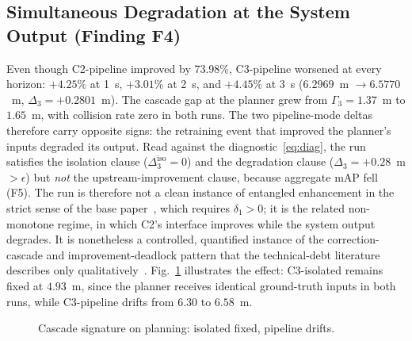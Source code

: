 \documentclass[conference]{IEEEtran}
\begin{document}
\subsection{Simultaneous Degradation at the System Output (Finding F4)}
Even though C2-pipeline improved by 73.98\%, C3-pipeline worsened at every
horizon: $+4.25\%$ at 1~s, $+3.01\%$ at 2~s, and $+4.45\%$ at 3~s ($6.2969$~m
$\to 6.5770$~m, $\Delta_3 = +0.2801$~m). The cascade gap at the planner grew
from $\Gamma_3 = 1.37$~m to $1.65$~m, with collision rate zero in both runs.
The two pipeline-mode deltas therefore carry opposite signs: the retraining
event that improved the planner's inputs degraded its output. Read against the
diagnostic~\eqref{eq:diag}, the run satisfies the isolation clause
($\Delta_3^{\text{iso}}=0$) and the degradation clause
($\Delta_3 = +0.28$~m $> \epsilon$) but \emph{not} the upstream-improvement
clause, because aggregate mAP fell (F5). The run is therefore not a clean
instance of entangled enhancement in the strict sense of the base
paper~\cite{wang2024compsac}, which requires $\delta_1 > 0$; it is the related
non-monotone regime, in which C2's interface improves while the system output
degrades. It is nonetheless a controlled, quantified instance of the
correction-cascade and improvement-deadlock pattern that the technical-debt
literature describes only qualitatively~\cite{sculley2015hidden}.
Fig.~\ref{fig:cascade} illustrates the effect: C3-isolated remains fixed at
$4.93$~m, since the planner
receives identical ground-truth inputs in both runs, while C3-pipeline drifts
from $6.30$ to $6.58$~m.

\begin{figure}[htbp]
\centering
{}
\caption{Cascade signature on planning: isolated fixed, pipeline drifts.}
\label{fig:cascade}
\end{figure}
\end{document}
